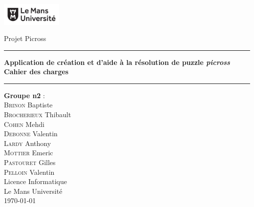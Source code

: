\documentclass[a4paper, 12pt]{report}
\begin{document}
\begin{titlepage}

	

		\begin{spacing}{1.5}
			\begin{minipage}{0.4\textwidth}
					\includegraphics[width=3cm]{logo.png}
			\end{minipage}
			\begin{minipage}{0.5\textwidth}\raggedleft
					Projet Picross\\
			\end{minipage}
						\vspace*{\fill}

		\end{spacing}
	

	
	\begin{center}
		\begin{spacing}{2}
		    \hrule \vspace{1cm}
			\textbf{\Huge Application de création et d'aide à la résolution de puzzle \textit{picross}}\\[0.5cm]
			\textbf{\huge Cahier des charges} \\
			\vspace{1cm}
			\hrule

			\vspace*{\fill}
		\end{spacing}

		\begin{spacing}{1.15}
			\large\textbf{Groupe n\up{o}2} :\\
			\large
			\textsc{Brinon} Baptiste\\
			\textsc{Brocherieux} Thibault\\
			\textsc{Cohen} Mehdi\\
			\textsc{Debonne} Valentin\\
			\textsc{Lardy} Anthony\\
			\textsc{Mottier} Emeric\\
			\textsc{Pastouret} Gilles\\
			\textsc{Pelloin} Valentin\\
			\vspace*{\fill}
			\textnormal{\large Licence Informatique\\ Le Mans Université\\ \today}
		\end{spacing}
		
	\end{center}
\end{titlepage}
\end{document}

